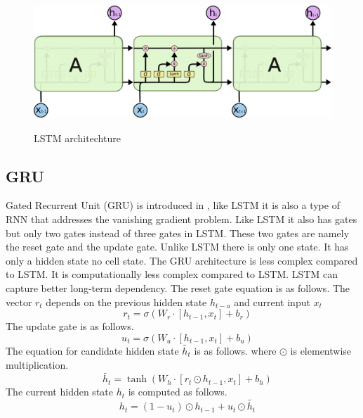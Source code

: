 \documentclass{ws-ijait}
\begin{document}
\begin{center}
	\begin{figure}[!htbp]
		\centering
		\includegraphics[width=12cm, height=5cm]{lstm.png}
		\caption{LSTM architechture}
		\label{lstm}
	\end{figure}
\end{center}


\subsection{GRU}
\par Gated Recurrent Unit (GRU) is introduced in \cite{cho2014learning}, like LSTM it is also a type of RNN that addresses the vanishing gradient problem. Like LSTM it also has gates but only two gates instead of three gates in LSTM. These two gates are namely the reset gate and the update gate. Unlike LSTM there is only one state. It has only a hidden state no cell state. The GRU architecture is less complex compared to LSTM. It is computationally less complex compared to LSTM. LSTM can capture better long-term dependency. The reset gate equation is as follows. The vector $r_t$ depends on the previous hidden state $h_{t-a}$ and current input $x_t$
\begin{equation}
	\quad r_t = \sigma(W_{r} \cdot [h_{t-1},x_t] + b_{r})
\end{equation}
The update gate is as follows. 
\begin{equation}
	\quad u_t = \sigma(W_{u} \cdot [h_{t-1},x_t] + b_{u})
\end{equation} 
The equation for candidate hidden state $\tilde{h_t}$ is as follows. where $\odot$ is elementwise multiplication.  
\begin{equation}
	\quad \tilde{h_t}= \tanh(W_{h} \cdot [r_t\odot h_{t-1},x_t] + b_{h})
\end{equation}
The current hidden state ${h_t}$ is computed as follows.
\begin{equation}
	\quad {h_t}= (1-u_t) \odot h_{t-1} + u_t \odot \tilde{h_t}
\end{equation}
\end{document}
